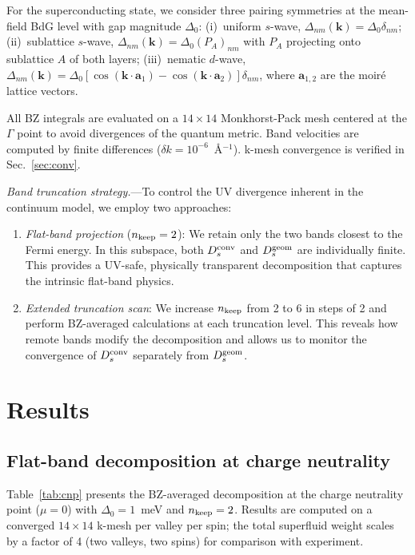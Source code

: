 \documentclass[prb,twocolumn,superscriptaddress,floatfix]{revtex4-2}
\begin{document}
For the superconducting state, we consider three pairing symmetries at the mean-field BdG level with gap magnitude $\Delta_0$:
(i)~uniform $s$-wave, $\Delta_{nm}(\mathbf{k}) = \Delta_0 \delta_{nm}$;
(ii)~sublattice $s$-wave, $\Delta_{nm}(\mathbf{k}) = \Delta_0 (P_A)_{nm}$ with $P_A$ projecting onto sublattice $A$ of both layers;
(iii)~nematic $d$-wave, $\Delta_{nm}(\mathbf{k}) = \Delta_0 [\cos(\mathbf{k}\cdot\mathbf{a}_1) - \cos(\mathbf{k}\cdot\mathbf{a}_2)] \delta_{nm}$, where $\mathbf{a}_{1,2}$ are the moir\'e lattice vectors.

All BZ integrals are evaluated on a $14 \times 14$ Monkhorst-Pack mesh centered at the $\Gamma$ point to avoid divergences of the quantum metric.
Band velocities are computed by finite differences ($\delta k = 10^{-6}$~\AA$^{-1}$).
k-mesh convergence is verified in Sec.~\ref{sec:conv}.

\textit{Band truncation strategy.}---To control the UV divergence inherent in the continuum model, we employ two approaches:
\begin{enumerate}
\item \textit{Flat-band projection} ($n_{\rm keep} = 2$): We retain only the two bands closest to the Fermi energy.
In this subspace, both $D_s^{\rm conv}$ and $D_s^{\rm geom}$ are individually finite.
This provides a UV-safe, physically transparent decomposition that captures the intrinsic flat-band physics.
\item \textit{Extended truncation scan}: We increase $n_{\rm keep}$ from 2 to 6 in steps of 2 and perform BZ-averaged calculations at each truncation level.
This reveals how remote bands modify the decomposition and allows us to monitor the convergence of $D_s^{\rm conv}$ separately from $D_s^{\rm geom}$.
\end{enumerate}

\section{Results}

\subsection{Flat-band decomposition at charge neutrality}

Table~\ref{tab:cnp} presents the BZ-averaged decomposition at the charge neutrality point ($\mu = 0$) with $\Delta_0 = 1$~meV and $n_{\rm keep} = 2$.
Results are computed on a converged $14 \times 14$ k-mesh per valley per spin; the total superfluid weight scales by a factor of 4 (two valleys, two spins) for comparison with experiment.
\end{document}
